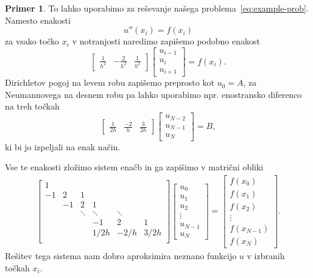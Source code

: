 \documentclass[12pt,a4paper]{article}
\theoremstyle{definition} %
\newtheorem{primer}[definicija]{Primer}
\theoremstyle{plain} %
\begin{document}
\begin{primer}
To lahko uporabimo za reševanje našega problema~\eqref{eq:example-prob}.
Namesto enakosti
\[ u''(x_i) = f(x_i) \]
za vsako točko $x_i$ v notranjosti naredimo zapišemo podobno enakost
\[
  \begin{bmatrix}
    \frac{1}{h^2} & -\frac{2}{h^2} & \frac{1}{h^2}
  \end{bmatrix}\begin{bmatrix}
    u_{i-1} \\ u_{i} \\ u_{i+1}
  \end{bmatrix} = f(x_i).
\]
Dirichletov pogoj na levem robu zapišemo preprosto kot $u_0 = A$,
za Neumannovega na desnem robu pa lahko uporabimo npr. enostransko diferenco
na treh točkah \[
  \begin{bmatrix}
    \frac{1}{2h} & \frac{-2}{h} & \frac{3}{2h}
  \end{bmatrix}\begin{bmatrix}
    u_{N-2} \\ u_{N-1} \\ u_{N}
  \end{bmatrix} = B,
\]
ki bi jo izpeljali na enak način.

Vse te enakosti zložimo sistem enačb in ga zapišimo v matrični obliki
\begin{align*}
  \begin{bmatrix}
    1 &  \\
    -1 & 2 & 1 \\
    & -1 & 2 & 1 \\
    & & \!\ddots & \!\ddots & \! \ddots \\
    &&& -1 & 2 & 1 \\
    &&& 1/2h & -2/h & 3/2h \\
  \end{bmatrix}
\begin{bmatrix}
  u_0 \\ u_1 \\ u_2 \\ \vdots \\ u_{N-1} \\ u_N
\end{bmatrix}
 =
 \begin{bmatrix}
   f(x_0) \\
   f(x_1) \\
   f(x_2) \\
   \vdots \\
   f(x_{N-1}) \\
   f(x_N)
 \end{bmatrix}.
\end{align*}
Rešitev tega sistema nam dobro aproksimira neznano funkcijo $u$ v izbranih
točkah $x_i$.
\end{primer}
\end{document}
